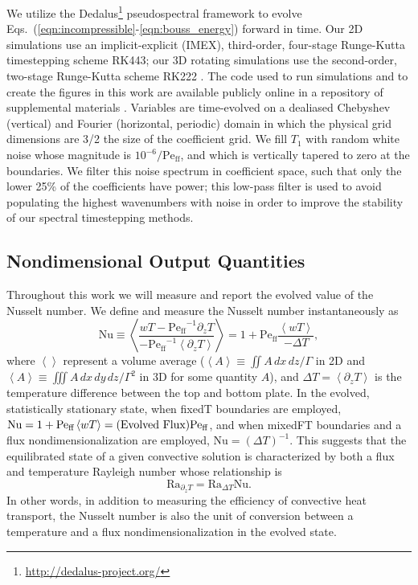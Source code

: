 \documentclass[aps, pre, onecolumn, nofootinbib, notitlepage, groupedaddress, amsfonts, amssymb, amsmath, longbibliography, superscriptaddress]{revtex4-1}
\newcommand{\angles}[1]{\ensuremath{\left\langle #1 \right\rangle}}
\newcommand{\Peff}{\ensuremath{\text{Pe}_{\text{ff}}}}
\begin{document}
We utilize the Dedalus\footnote{\url{http://dedalus-project.org/}} pseudospectral framework \cite{burns&all2016, burns&all2019} to evolve Eqs.~(\ref{eqn:incompressible}-\ref{eqn:bouss_energy}) forward in time.
Our 2D simulations use an implicit-explicit (IMEX), third-order, four-stage Runge-Kutta timestepping scheme RK443; our 3D rotating simulations use the second-order, two-stage Runge-Kutta scheme RK222 \cite{ascher&all1997}. 
The code used to run simulations and to create the figures in this work are available publicly online in a repository of supplemental materials \cite{anders&all2020a_supp}.
Variables are time-evolved on a dealiased Chebyshev (vertical) and Fourier (horizontal, periodic) domain in which the physical grid dimensions are 3/2 the size of the coefficient grid.  
We fill $T_1$ with random white noise whose magnitude is $10^{-6}/\Peff$, and which is vertically tapered to zero at the boundaries.
We filter this noise spectrum in coefficient space, such that only the lower 25\% of the coefficients have power; this low-pass filter is used to avoid populating the highest wavenumbers with noise in order to improve the stability of our spectral timestepping methods.


\subsection{Nondimensional Output Quantities}
\label{sec:ra_nu_relations}
Throughout this work we will measure and report the evolved value of the Nusselt number.
We define and measure the Nusselt number instantaneously as
\begin{equation}
\text{Nu} \equiv \angles{\frac{w T - \Peff^{-1} \partial_z T}{-\Peff^{-1} \angles{\partial_z T}}}
= 1 + \Peff\frac{\angles{w T}}{-\Delta T},
\end{equation}
where $\angles{}$ represent a volume average ($\angles{A} \equiv \iint A\,dx\,dz / \Gamma$ in 2D and $\angles{A} \equiv \iiint A\,dx\,dy\,dz / \Gamma^2$ in 3D for some quantity $A$), and $\Delta T = \angles{\partial_z T}$ is the temperature difference between the top and bottom plate.
In the evolved, statistically stationary state, when fixedT boundaries are employed, $\text{Nu} = 1 + \Peff\angles{wT} = \text{(Evolved Flux)\Peff}$, and when mixedFT boundaries and a flux nondimensionalization are employed, $\text{Nu} = (\Delta T)^{-1}$.
This suggests that the equilibrated state of a given convective solution is characterized by both a flux and temperature Rayleigh number whose relationship is
\begin{equation}
\text{Ra}_{\partial_z T} = \text{Ra}_{\Delta T} \text{Nu}.
\label{eqn:ra_relation}
\end{equation}
In other words, in addition to measuring the efficiency of convective heat transport, the Nusselt number is also the unit of conversion between a temperature and a flux nondimensionalization in the evolved state.
\end{document}
